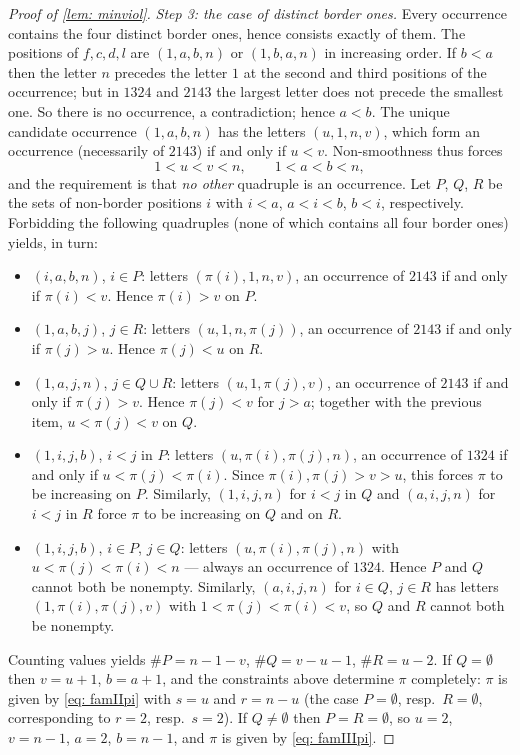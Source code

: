 \documentclass[12pt]{article}
\begin{document}
\begin{proof}[Proof of \cref{lem: minviol}]
\emph{Step 3: the case of distinct border ones.}
Every occurrence contains the four distinct border ones, hence consists exactly of them. The positions of $f,c,d,l$
are $(1,a,b,n)$ or $(1,b,a,n)$ in increasing order. If $b<a$ then the letter $n$ precedes the letter $1$ at the
second and third positions of the occurrence; but in $1324$ and $2143$ the largest letter does not precede the
smallest one. So there is no occurrence, a contradiction; hence $a<b$. The unique candidate occurrence
$(1,a,b,n)$ has the letters $(u,1,n,v)$, which form an occurrence (necessarily of $2143$) if and only if $u<v$.
Non-smoothness thus forces
\[
1<u<v<n,\qquad 1<a<b<n,
\]
and the requirement is that \emph{no other} quadruple is an occurrence. Let
$P$, $Q$, $R$ be the sets of non-border positions $i$ with $i<a$, $a<i<b$, $b<i$, respectively.
Forbidding the following quadruples (none of which contains all four border ones) yields, in turn:
\begin{itemize}
\item $(i,a,b,n)$, $i\in P$: letters $(\pi(i),1,n,v)$, an occurrence of $2143$ if and only if $\pi(i)<v$.
Hence $\pi(i)>v$ on $P$.
\item $(1,a,b,j)$, $j\in R$: letters $(u,1,n,\pi(j))$, an occurrence of $2143$ if and only if $\pi(j)>u$.
Hence $\pi(j)<u$ on $R$.
\item $(1,a,j,n)$, $j\in Q\cup R$: letters $(u,1,\pi(j),v)$, an occurrence of $2143$ if and only if $\pi(j)>v$.
Hence $\pi(j)<v$ for $j>a$; together with the previous item, $u<\pi(j)<v$ on $Q$.
\item $(1,i,j,b)$, $i<j$ in $P$: letters $(u,\pi(i),\pi(j),n)$, an occurrence of $1324$ if and only if
$u<\pi(j)<\pi(i)$. Since $\pi(i),\pi(j)>v>u$, this forces $\pi$ to be increasing on $P$.
Similarly, $(1,i,j,n)$ for $i<j$ in $Q$ and $(a,i,j,n)$ for $i<j$ in $R$ force $\pi$ to be increasing on $Q$ and
on $R$.
\item $(1,i,j,b)$, $i\in P$, $j\in Q$: letters $(u,\pi(i),\pi(j),n)$ with $u<\pi(j)<\pi(i)<n$ --- always an
occurrence of $1324$. Hence $P$ and $Q$ cannot both be nonempty. Similarly, $(a,i,j,n)$ for $i\in Q$, $j\in R$
has letters $(1,\pi(i),\pi(j),v)$ with $1<\pi(j)<\pi(i)<v$, so $Q$ and $R$ cannot both be nonempty.
\end{itemize}
Counting values yields $\#P=n-1-v$, $\#Q=v-u-1$, $\#R=u-2$.
If $Q=\emptyset$ then $v=u+1$, $b=a+1$, and the constraints above determine $\pi$ completely:
$\pi$ is given by \cref{eq: famIIpi} with $s=u$ and $r=n-u$ (the case $P=\emptyset$, resp.\ $R=\emptyset$,
corresponding to $r=2$, resp.\ $s=2$). If $Q\ne\emptyset$ then $P=R=\emptyset$, so $u=2$, $v=n-1$, $a=2$, $b=n-1$,
and $\pi$ is given by \cref{eq: famIIIpi}.


\end{proof}
\end{document}
